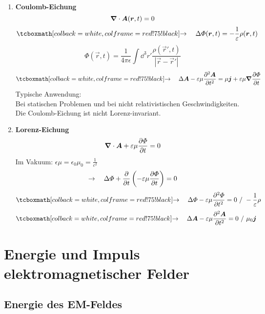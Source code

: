 \begin{enumerate}[1)]
	\item \textbf{Coulomb-Eichung}
	\begin{equation*}
	\bm{\nabla} \cdot \bm{A}(\bm{r},t) = 0
	\end{equation*}
	\begin{equation*}
	\rmbox{\rightarrow \quad \Delta \Phi(\vec{r},t) = - \frac{1}{\epsilon} \rho(\vec{r},t)}
	\end{equation*}
	\begin{equation*}
	\Phi(\vec{r},t) = \frac{1}{4 \pi \epsilon} \int \dd ^3 r' \frac{\rho(\vec{r}',t)}{|\vec{r} - \vec{r}'|}
	\end{equation*}
	\begin{equation*}
	\rmbox{ \rightarrow \quad \Delta \vec{A} - \epsilon \mu \prt{^2 \vec{A}}{t^2} = \mu \vec{j} + \epsilon \mu \vabla \prt{\Phi}{t}}
	\end{equation*}
	Typische Anwendung:\\
	Bei statischen Problemen und bei nicht relativistischen Geschwindigkeiten.\\
	Die Coulomb-Eichung ist nicht Lorenz-invariant.
	\item \textbf{Lorenz-Eichung}
	\begin{equation*}
	\bm{\nabla} \cdot \bm{A} + \varepsilon \mu \frac{\partial \varPhi}{\partial t} = 0
	\end{equation*}
	Im Vakuum: $ \epsilon \mu = \epsilon_0 \mu_0 = \frac{1}{c^2} $
	\begin{equation*}
	\rightarrow \quad \Delta \varPhi + \frac{\partial }{\partial t} \left(- \varepsilon \mu \frac{\partial \varPhi}{\partial t}\right) = 0
	\end{equation*}
	\begin{equation*}
	\rmbox{\rightarrow \quad \Delta \Phi - \epsilon \mu \prt{^2 \Phi}{t^2} = 0 \ / \ - \frac{1}{\epsilon} \rho}
	\end{equation*}
	\begin{equation*}
	\rmbox{\rightarrow \quad \Delta \vec{A} - \epsilon \mu \prt{^2 \vec{A}}{t^2} = 0 \ / \ \mu_0 \vec{j} \ \ }
	\end{equation*}
\end{enumerate}


\section{Energie und Impuls elektromagnetischer Felder}

\subsection{Energie des EM-Feldes}

